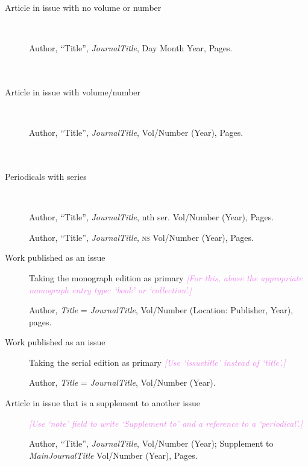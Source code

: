 \documentclass[extrafontsizes,11pt,a4paper,oneside]{memoir}
\newcommand*{\lit}[1]{\textsf{#1}}
\newcommand*{\code}[1]{`\textsf{#1}'}
\newcommand*{\aside}[1]{\textcolor{violet}{\emph{[#1]}}}
\begin{document}
\begin{description}
  \item[Article in issue with no volume or number]~
  \par Author, \enquote{Title}, \emph{JournalTitle}, Day Month Year, Pages.
  \\
  \\
  \\
  
  \item[Article in issue with volume/number]~
  \par Author, \enquote{Title}, \emph{JournalTitle}, Vol/Number (Year), Pages.
  \\
  \\
  \\
  
  \item[Periodicals with series]~
  \par Author, \enquote{Title}, \emph{JournalTitle}, nth \lit{ser}. Vol/Number (Year), Pages.
  \par Author, \enquote{Title}, \emph{JournalTitle}, \textsc{ns} Vol/Number (Year), Pages.
  \\
  
  \item[Work published as an issue] Taking the monograph edition as primary \aside{For this, abuse the appropriate monograph entry type: \code{book} or \code{collection}.}
  \par Author, \emph{Title} = \emph{JournalTitle}, Vol/Number (Location: Publisher, Year), pages.
  \\
  
  \item[Work published as an issue] Taking the serial edition as primary \aside{Use \code{issuetitle} instead of \code{title}.}
  \par Author, \emph{Title} = \emph{JournalTitle}, Vol/Number (Year).
  \\
  
  \item[Article in issue that is a supplement to another issue] \aside{Use \code{note} field to write ‘Supplement to’ and a reference to a \code{periodical}.}
  \par Author, \enquote{Title}, \emph{JournalTitle}, Vol/Number (Year); \lit{Supplement to} \emph{MainJournalTitle} Vol/Number (Year), Pages.
  \\
  

\end{description}
\end{document}
